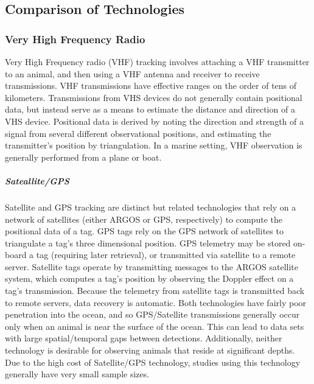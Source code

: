 \subsection{Comparison of Technologies}
\subsubsection{Very High Frequency Radio}
Very High Frequency radio (VHF) tracking involves attaching a VHF transmitter to an animal, and then using a VHF antenna and receiver to receive transmissions.  VHF transmissions have effective ranges on the order of tens of kilometers.  Transmissions from VHS devices do not generally contain positional data, but instead serve as a means to estimate the distance and direction of a VHS device.  Positional data is derived by noting the direction and strength of a signal from several different observational positions, and estimating the transmitter's position by triangulation\cite{USDA}.  In a marine setting, VHF observation is generally performed from a plane or boat\cite{Wikipedia_RadioTracking}.

\subparagraph{Sateallite/GPS}
Satellite and GPS tracking are distinct but related technologies that rely on a network of satellites (either ARGOS or GPS, respectively) to compute the positional data of a tag. GPS tags rely on the GPS network of satellites to triangulate a tag's three dimensional position. GPS telemetry may be stored on-board a tag (requiring later retrieval), or transmitted via satellite to a remote server\cite{USDA}. Satellite tags operate by transmitting messages to the ARGOS satellite system, which computes a tag's position by observing the Doppler effect on a tag's transmission\cite{ARGOS}.  Because the telemetry from satellite tags is transmitted back to remote servers, data recovery is automatic.  Both technologies have fairly poor penetration into the ocean, and so GPS/Satellite transmissions generally occur only when an animal is near the surface of the ocean.  This can lead to data sets with large spatial/temporal gaps between detections.  Additionally, neither technology is desirable for observing animals that reside at significant depths.  Due to the high cost of Satellite/GPS technology, studies using this technology generally have very small sample sizes.  


